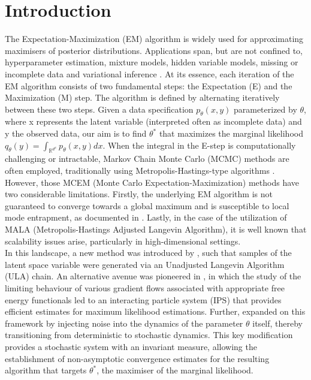 \documentclass[a4paper, 10pt]{article}
\theoremstyle{plain}%
\begin{document}
\section{Introduction}
The Expectation-Maximization (EM) algorithm is widely used for approximating maximisers of posterior distributions. Applications span, but are not confined to, hyperparameter estimation, mixture models, hidden variable models, missing or incomplete data and variational inference \cite{EM}. At its essence, each iteration of the EM algorithm consists of two fundamental steps: the Expectation (E) and the Maximization (M) step. The algorithm is defined by alternating iteratively between these two steps. Given a data specification $p_{\theta}(x,y)$ parameterized by $\theta$, where x represents the latent variable (interpreted often as incomplete data) and y the observed data, our aim is to find $\theta^{*}$ that maximizes the marginal likelihood 
$q_{\theta}(y)=\int_{\mathbb{R}^{d^x}}p_{\theta}(x,y)dx$.\newline
\indent When the integral in the E-step is computationally challenging or intractable, Markov Chain Monte Carlo (MCMC) methods are often employed, traditionally using Metropolis-Hastings-type algorithms \cite{MetroMCMC,Wei}. However, those MCEM (Monte Carlo Expectation-Maximization) methods have two considerable limitations. Firstly, the underlying EM algorithm is not guaranteed to converge towards a global maximum and is susceptible to local mode entrapment, as documented in \cite{EM}. Lastly, in the case of the utilization of MALA (Metropolis-Hastings Adjusted Langevin Algorithm), it is well known that scalability issues arise, particularly in high-dimensional settings.\\
\indent In this landscape, a new method was introduced by \cite{Soul}, such that samples of the latent space variable were generated via an Unadjusted Langevin Algorithm (ULA) chain. %
An alternative avenue was pioneered in \cite{Kuntz}, in which the study of the limiting behaviour of various gradient flows associated with appropriate free energy functionals led to an interacting particle system (IPS) that provides efficient estimates for maximum likelihood estimations. Further, \cite{Ipla} expanded on this framework by injecting noise into the dynamics of the parameter $\theta$ itself, thereby transitioning from deterministic to stochastic dynamics. This key modification provides a stochastic system with an invariant measure, allowing the establishment of non-asymptotic convergence estimates for the resulting algorithm that targets $\theta^{*}$, the maximiser of the marginal likelihood.\\
\end{document}
